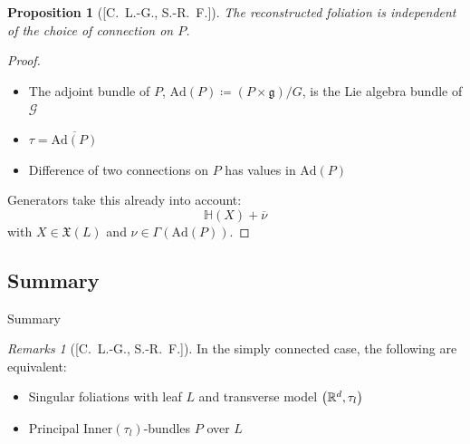 \documentclass[hyperref={pdfpagelabels=false}]{beamer}
\def\bes{\begin{equation*}}
\def\ees{\end{equation*}}
\theoremstyle{plain}
\newtheorem{proposition}[theorem]{Proposition}
\theoremstyle{remark}
\newtheorem*{remark}{Remarks}
\begin{document}
{{\begin{frame}
\begin{proposition}[{[C.\ L.-G., S.-R.\ F.]}]
The reconstructed foliation is independent of the choice of connection on $P$.
\end{proposition}
\pause
\begin{proof}
\begin{itemize}
	\item The adjoint bundle of $P$, $\mathup{Ad}(P) \coloneqq (P \times \mathfrak{g})/G$, is the Lie algebra bundle of $\mathcal{G}$
	\item $\tau = \overline{\mathup{Ad}(P)}$
	\item Difference of two connections on $P$ has values in $\mathup{Ad}(P)$
\end{itemize}
Generators take this already into account:
\bes
\mathbb{H}(X) + \overline{\nu}
\ees
with $X \in \mathfrak{X}(L)$ and $\nu \in \Gamma(\mathup{Ad}(P))$.
\end{proof}
\end{frame}

\subsection{Summary}

\begin{frame}{Summary}
\begin{remark}[{[C.\ L.-G., S.-R.\ F.]}]
In the simply connected case, the following are equivalent:
\begin{itemize}
	\item Singular foliations with leaf $L$ and transverse model $\mleft(\mathbb{R}^d, \tau_l\mright)$
	\item Principal $\mathrm{Inner}(\tau_l)$-bundles $P$ over $L$
\end{itemize}
\end{remark}


\end{frame}}}
\end{document}
